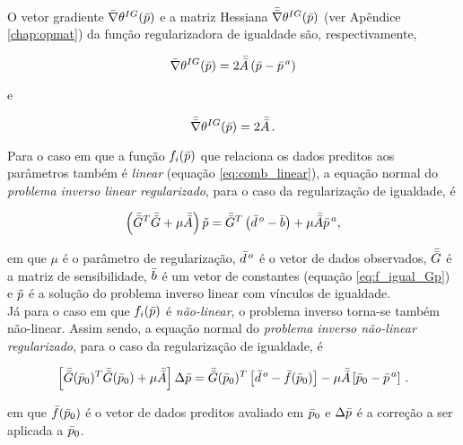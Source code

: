 \indent O vetor gradiente $\bar{\nabla}\theta^{IG}(\bar{p})$ e a matriz Hessiana
$\bar{\bar{\nabla}}\theta^{IG}(\bar{p})$ (ver Apêndice \ref{chap:opmat}) da função
regularizadora de igualdade são, respectivamente,

\begin{equation}
\bar{\nabla}\theta^{IG}(\bar{p}) = 2\bar{\bar{A}}
    \left(\bar{p} - \bar{p}^{\thinspace a} \right)
\end{equation}

\noindent e

\begin{equation}
\bar{\bar{\nabla}}\theta^{IG}(\bar{p}) = 2\bar{\bar{A}} \thinspace .
\end{equation}

\indent Para o caso em que a função $f_i(\bar{p})$ que relaciona
os dados preditos aos parâmetros também é {\it linear} (equação \ref{eq:comb_linear}),
a equação normal do {\it problema inverso linear regularizado},
para o caso da regularização de igualdade, é

\begin{equation}
\left(\bar{\bar{G}}^T\bar{\bar{G}} + \mu\bar{\bar{A}}\right)\tilde{p} =
    \bar{\bar{G}}^T\left(\bar{d}^{\thinspace o} - \bar{b} \right) +
    \mu\bar{\bar{A}}\bar{p}^{\thinspace a} ,
\end{equation}

\noindent em que $\mu$ é o parâmetro de regularização, $\bar{d}^{\thinspace o}$
é o vetor de dados observados, $\bar{\bar{G}}$ é a matriz de sensibilidade, $\bar{b}$
é um vetor de constantes (equação \ref{eq:f_igual_Gp}) e $\tilde{p}$ é a solução
do problema inverso linear com vínculos de igualdade.
\\
\indent Já para o caso em que $f_i(\bar{p})$ é {\it não-linear}, o problema
inverso torna-se também não-linear. Assim sendo, a equação normal do
{\it problema inverso não-linear regularizado}, para o caso da regularização de
igualdade, é

\begin{equation}
\left[\bar{\bar{G}}(\bar{p}_0)^T\bar{\bar{G}}(\bar{p}_0) +
      \mu\bar{\bar{A}}\right]\Delta\bar{p} =
\bar{\bar{G}}(\bar{p}_0)^T \left[\bar{d}^{\thinspace o} - \bar{f}(\bar{p}_0)\right] -
\mu\bar{\bar{A}}\left[\bar{p}_0 - \bar{p}^{\thinspace a}\right]
    \thinspace .
\end{equation}

\noindent em que $\bar{f}(\bar{p}_0)$ é o vetor de dados preditos avaliado em
$\bar{p}_0$ e $\Delta\bar{p}$ é a correção a ser aplicada a $\bar{p}_0$.

